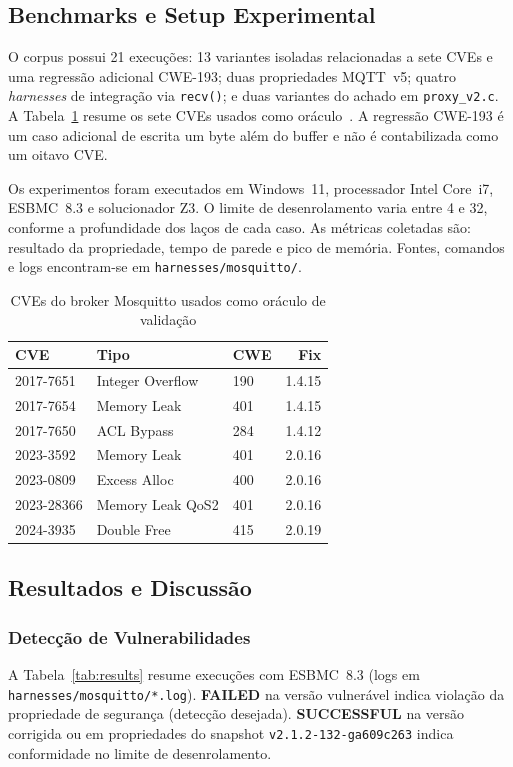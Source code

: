 \documentclass[conference]{IEEEtran}
\newcommand{\mosqsnapshot}{\texttt{v2.1.2-132-ga609c263}}
\begin{document}
\subsection{Benchmarks e Setup Experimental}
O corpus possui 21 execu\c{c}\~oes: 13 variantes isoladas relacionadas a sete
CVEs e uma regress\~ao adicional CWE-193; duas propriedades MQTT~v5; quatro
\emph{harnesses} de integra\c{c}\~ao via \texttt{recv()}; e duas variantes do
achado em \texttt{proxy\_v2.c}. A Tabela~\ref{tab:cves} resume os sete CVEs
usados como or\'aculo~\cite{cve_2017_7651,cve_2017_7654,cve_2017_7650,
cve_2023_3592,cve_2023_0809,cve_2023_28366,cve_2024_3935}. A regress\~ao
CWE-193 \'e um caso adicional de escrita um
byte al\'em do buffer e n\~ao \'e contabilizada como um oitavo CVE.

Os experimentos foram executados em Windows~11, processador Intel Core~i7,
ESBMC~8.3 e solucionador Z3. O limite de desenrolamento varia entre 4 e 32,
conforme a profundidade dos la\c{c}os de cada caso. As m\'etricas coletadas s\~ao:
resultado da propriedade, tempo de parede e pico de mem\'oria. Fontes, comandos
e logs encontram-se em \texttt{harnesses/mosquitto/}.

\begin{table}[htbp]
\caption{CVEs do broker Mosquitto usados como or\'aculo de valida\c{c}\~ao}
\label{tab:cves}
\centering
\scriptsize
\begin{tabular}{p{1.6cm}p{2.0cm}lr}
\hline
CVE & Tipo & CWE & Fix \\
\hline
2017-7651 & Integer Overflow  & 190 & 1.4.15 \\
2017-7654 & Memory Leak       & 401 & 1.4.15 \\
2017-7650 & ACL Bypass        & 284 & 1.4.12 \\
2023-3592  & Memory Leak      & 401 & 2.0.16 \\
2023-0809  & Excess Alloc     & 400 & 2.0.16 \\
2023-28366 & Memory Leak QoS2 & 401 & 2.0.16 \\
2024-3935  & Double Free      & 415 & 2.0.19 \\
\hline
\end{tabular}
\end{table}

\subsection{Resultados e Discuss\~ao}

\subsubsection{Detec\c{c}\~ao de Vulnerabilidades}
A Tabela~\ref{tab:results} resume execu\c{c}\~oes com ESBMC~8.3 (logs em
\texttt{harnesses/mosquitto/*.log}). \textbf{FAILED} na vers\~ao vulner\'avel indica
viola\c{c}\~ao da propriedade de seguran\c{c}a (detec\c{c}\~ao desejada).
\textbf{SUCCESSFUL} na vers\~ao corrigida ou em propriedades do snapshot
\mosqsnapshot
indica conformidade no limite de desenrolamento.
\end{document}
